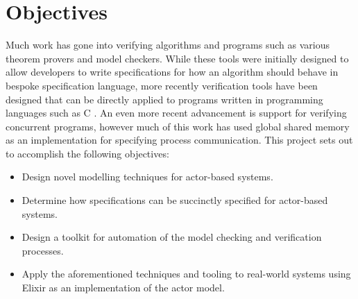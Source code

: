 \section{Objectives}
Much work has gone into verifying algorithms and programs such as various theorem provers and model checkers. While these tools were initially designed to allow developers to write specifications for how an algorithm should behave in bespoke specification language, more recently verification tools have been designed that can be directly applied to programs written in programming languages such as C \cite{}. An even more recent advancement is support for verifying concurrent programs, however much of this work has used global shared memory as an implementation for specifying process communication. This project sets out to accomplish the following objectives:
\begin{itemize}
    \item Design novel modelling techniques for actor-based systems.
    \item Determine how specifications can be succinctly specified for actor-based systems.
    \item Design a toolkit for automation of the model checking and verification processes.
    \item Apply the aforementioned techniques and tooling to real-world systems using Elixir as an implementation of the actor model.
\end{itemize}
